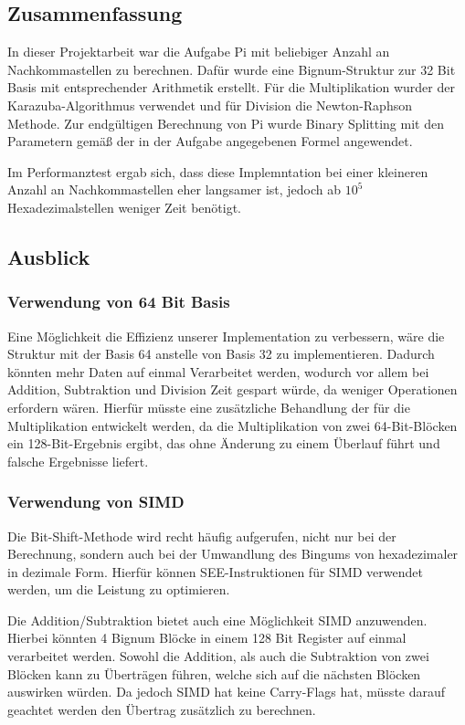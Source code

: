 \documentclass[course=erap]{aspdoc}
\begin{document}
\subsection{Zusammenfassung}
In dieser Projektarbeit war die Aufgabe Pi mit beliebiger Anzahl an Nachkommastellen zu berechnen. Dafür wurde eine Bignum-Struktur zur 32 Bit Basis mit entsprechender Arithmetik erstellt. Für die Multiplikation wurder der Karazuba-Algorithmus verwendet und für Division die Newton-Raphson Methode. Zur endgültigen Berechnung von Pi wurde Binary Splitting mit den Parametern gemäß der in der Aufgabe angegebenen Formel angewendet.

Im Performanztest ergab sich, dass diese Implemntation bei einer kleineren Anzahl an Nachkommastellen eher langsamer ist, jedoch ab $10^5$ Hexadezimalstellen weniger Zeit benötigt.

\subsection{Ausblick}
\subsubsection{Verwendung von 64 Bit Basis}
Eine Möglichkeit die Effizienz unserer Implementation zu verbessern, wäre die Struktur mit der Basis 64 anstelle von Basis 32 zu implementieren. Dadurch könnten mehr Daten auf einmal Verarbeitet werden, wodurch vor allem bei Addition, Subtraktion und Division Zeit gespart würde, da weniger Operationen erfordern wären. Hierfür müsste eine zusätzliche Behandlung der für die Multiplikation entwickelt werden, da die Multiplikation von zwei 64-Bit-Blöcken  ein 128-Bit-Ergebnis ergibt, das ohne Änderung zu einem Überlauf führt und falsche Ergebnisse liefert.

\subsubsection{Verwendung von SIMD}
Die Bit-Shift-Methode wird recht häufig aufgerufen, nicht nur bei der Berechnung, sondern auch bei der Umwandlung des Bingums von hexadezimaler in dezimale Form. Hierfür können SEE-Instruktionen für SIMD verwendet werden, um die Leistung zu optimieren. 

Die Addition/Subtraktion bietet auch eine Möglichkeit SIMD anzuwenden. Hierbei könnten 4 Bignum Blöcke in einem 128 Bit Register auf einmal verarbeitet werden.
Sowohl die Addition, als auch die Subtraktion von zwei Blöcken kann zu Überträgen führen, welche sich auf die nächsten Blöcken auswirken würden. Da jedoch SIMD hat keine Carry-Flags hat, müsste darauf geachtet werden den Übertrag zusätzlich zu berechnen.

\newpage


{}
\end{document}
